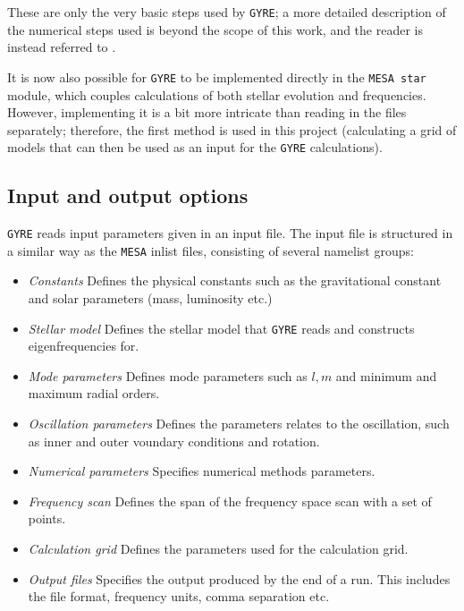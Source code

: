 These are only the very basic steps used by \texttt{GYRE}; a more detailed description of the numerical steps used is beyond the scope of this work, and the reader is instead referred to \citep{townsend2013}.

It is now also possible for \texttt{GYRE} to be implemented directly in the \texttt{MESA star} module, which couples calculations of both stellar evolution and frequencies. However, implementing it is a bit more intricate than reading in the files separately; therefore, the first method is used in this project (calculating a grid of models that can then be used as an input for the \texttt{GYRE} calculations). 

\subsection{Input and output options}

\texttt{GYRE} reads input parameters given in an input file. The input file is structured in a similar way as the \texttt{MESA} inlist files, consisting of several namelist groups: 

\begin{itemize}
    \item \emph{Constants} Defines the physical constants such as the gravitational constant and solar parameters (mass, luminosity etc.)
    \item \emph{Stellar model} Defines the stellar model that \texttt{GYRE} reads and constructs eigenfrequencies for. 
    \item \emph{Mode parameters} Defines mode parameters such as $l,m$ and minimum and maximum radial orders. 
    \item \emph{Oscillation parameters} Defines the parameters relates to the oscillation, such as inner and outer voundary conditions and rotation. 
    \item \emph{Numerical parameters} Specifies numerical methods parameters. 
    \item \emph{Frequency scan} Defines the span of the frequency space scan with a set of points. 
    \item \emph{Calculation grid} Defines the parameters used for the calculation grid. 
    \item \emph{Output files} Specifies the output produced by the end of a run. This includes the file format, frequency units, comma separation etc.  
\end{itemize}

